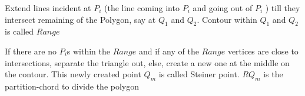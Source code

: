 \begin{frame}{}
\begin{list}{}{}

\item 
Extend lines incident at $P_i$ (the line coming into $P_i$ and going out of $P_i$ ) till they intersect remaining of the Polygon, say at $Q_1$ and $Q_2$. Contour within $Q_1$ and $Q_2$ is called $Range$ %


\item 
If there are no $P_i$s within the $Range$ and if any of the $Range$ vertices are close to intersections, separate the triangle out, else, create a new one at the middle on the contour. This newly created point  $Q_m$ is called Steiner point.  $RQ_m$ is the partition-chord to divide the polygon %



\end{list}

\end{frame}

